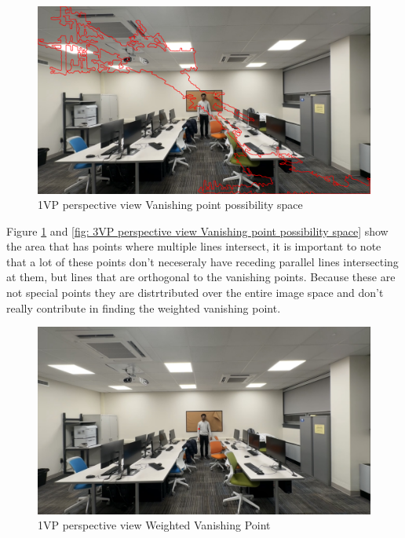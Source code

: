 \begin{figure}[H]
    \centering
    \includegraphics[width=1.0\textwidth]{1vp Most Converged Area.png}
    \caption{1VP perspective view Vanishing point possibility space}
    \label{fig: 1VP perspective view Vanishing point possibility space}
\end{figure}

Figure \ref{fig: 1VP perspective view Vanishing point possibility space} and \ref{fig: 3VP perspective view Vanishing point possibility space} show the area that has points where multiple lines intersect, it is important to note that a lot of these points don’t neceseraly have receding parallel lines intersecting at them, but lines that are orthogonal to the vanishing points. Because these are not special points they are distrtributed over the entire image space and don’t really contribute in finding the weighted vanishing point.\newline

\begin{figure}[H]
    \centering
    \includegraphics[width=1.0\textwidth]{1vp Centroid of Most Converged Area.png}
    \caption{1VP perspective view Weighted Vanishing Point}
    \label{fig: 1VP perspective view Weighted Vanishing Point}
\end{figure}

